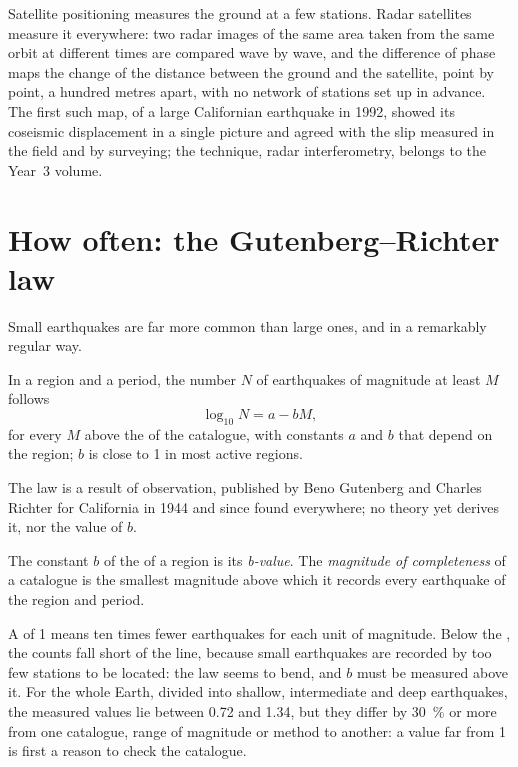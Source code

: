 Satellite positioning measures the ground at a few stations. Radar satellites
measure it everywhere: two radar images of the same area taken from the same
orbit at different times are compared wave by wave, and the difference of
phase maps the change of the distance between the ground and the satellite,
point by point, a hundred metres apart, with no network of stations set up in
advance. The first such map, of a large Californian earthquake in 1992, showed
its coseismic displacement in a single picture and agreed with the slip
measured in the field and by surveying; the technique, radar interferometry,
belongs to the Year~3 volume.

\section{How often: the Gutenberg--Richter law}\label{sec:b1:earthquake-source:gr}

Small earthquakes are far more common than large ones, and in a remarkably
regular way.

\begin{proposition}\label{prop:b1:earthquake-source:gutenberg-richter}
In a region and a period, the number $N$ of earthquakes of magnitude at least
$M$ follows
\[
  \log_{10} N = a - bM ,
\]
for every $M$ above the  of the catalogue, with
constants $a$ and $b$ that depend on the region; $b$ is close to 1 in most
active regions.
\end{proposition}
\admitted

The law is a result of observation, published by Beno Gutenberg and Charles
Richter for California in 1944 and since found everywhere; no theory yet
derives it, nor the value of $b$.

\begin{definition}\label{def:b1:earthquake-source:b-value}
The constant $b$ of the  of a region is its
\emph{b-value}. The \emph{magnitude of
completeness} of a catalogue is the smallest
magnitude above which it records every earthquake of the region and period.
\end{definition}

A  of 1 means ten times fewer earthquakes for each unit of magnitude.
Below the , the counts fall short of the line, because
small earthquakes are recorded by too few stations to be located: the law
seems to bend, and $b$ must be measured above it. For the whole Earth,
divided into shallow, intermediate and deep earthquakes, the measured values
lie between 0.72 and 1.34, but they differ by \qty{30}{\percent} or more from
one catalogue, range of magnitude or method to another: a value far from 1 is
first a reason to check the catalogue.

